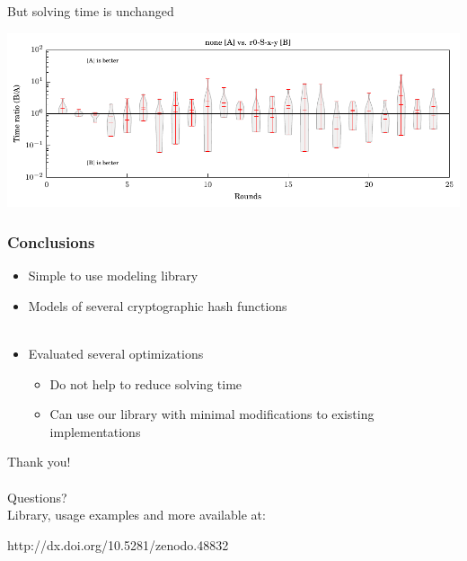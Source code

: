 \documentclass{beamer}
\let\olditem\item
\renewcommand{\item}{%
\olditem\vspace{4pt}}
\begin{document}
\begin{frame}
But solving time is unchanged

\vfill

\includegraphics[width=\textwidth]{figures/bo-ex1/ratio-time-none-r0sxy.pdf}
\end{frame}

\begin{frame}
\frametitle{Conclusions}
\begin{itemize}
\item Simple to use modeling library
\item Models of several cryptographic hash functions
~\\
~\\
\item Evaluated several optimizations
\begin{itemize}
	\item Do not help to reduce solving time
	\item Can use our library with minimal modifications to existing implementations
\end{itemize}
\end{itemize}
\end{frame}

\begin{frame}
\centering
{\Huge Thank you!}\\
~\\
{\Huge Questions?}\\
\vspace{30pt}
Library, usage examples and more available at:\\
\vspace{20pt}
\begin{minipage}{.3\textwidth}
http://dx.doi.org/10.5281/zenodo.48832
\end{minipage}
\hspace{100pt}
\begin{minipage}{.3\textwidth}
\end{minipage}
\end{frame}
\end{document}
